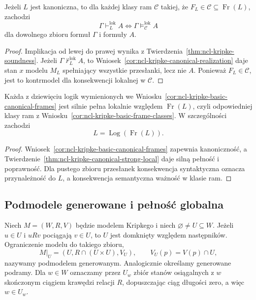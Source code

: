 \begin{twierdzenie}
\label{thm:ncl-kripke-canonical-strong-local}
Jeżeli $L$ jest kanoniczna, to dla każdej
klasy ram $\mathcal C$ takiej, że
$F_L\in\mathcal C\subseteq\operatorname{Fr}(L)$,
zachodzi
\[
 \Gamma\vdash_L^{\mathrm{lok}}A
 \iff\Gamma\models_{\mathcal C}^{\mathrm{lok}}A
\]
dla dowolnego zbioru formuł $\Gamma$ i formuły $A$.
\end{twierdzenie}
\begin{proof}
Implikacja od lewej do prawej wynika z
Twierdzenia~\ref{thm:ncl-kripke-soundness}.
Jeżeli $\Gamma\not\vdash_L^{\mathrm{lok}}A$,
to Wniosek~\ref{cor:ncl-kripke-canonical-realization}
daje stan $x$ modelu $M_L$ spełniający
wszystkie przesłanki, lecz nie $A$.
Ponieważ $F_L\in\mathcal C$, jest to
kontrmodel dla konsekwencji lokalnej w $\mathcal C$.
\end{proof}

\begin{wniosek}
\label{cor:ncl-kripke-basic-strong-local}
Każda z dziewięciu logik wymienionych we
Wniosku~\ref{cor:ncl-kripke-basic-canonical-frames}
jest silnie pełna lokalnie względem
$\operatorname{Fr}(L)$, czyli odpowiedniej klasy
ram z Wniosku~\ref{cor:ncl-kripke-basic-frame-classes}.
W szczególności zachodzi
\[
 L=\operatorname{Log}(\operatorname{Fr}(L)).
\]
\end{wniosek}
\begin{proof}
Wniosek~\ref{cor:ncl-kripke-basic-canonical-frames}
zapewnia kanoniczność, a
Twierdzenie~\ref{thm:ncl-kripke-canonical-strong-local}
daje silną pełność i poprawność.
Dla pustego zbioru przesłanek konsekwencja
syntaktyczna oznacza przynależność do $L$,
a konsekwencja semantyczna ważność w klasie ram.
\end{proof}

\subsection{Podmodele generowane i pełność globalna}

\begin{definicja}
\label{def:ncl-kripke-generated-submodel}
Niech $M=(W,R,V)$ będzie modelem Kripkego
i niech $\varnothing\ne U\subseteq W$.
Jeżeli $u\in U$ i $uRv$ pociągają $v\in U$,
to $U$ jest domknięty względem następników.
Ograniczenie modelu do takiego zbioru,
\[
 M|_U=(U,R\cap(U\times U),V_U),\qquad
 V_U(p)=V(p)\cap U,
\]
nazywamy podmodelem generowanym.
Analogicznie określamy generowane podramy.
Dla $w\in W$ oznaczamy przez $U_w$ zbiór
stanów osiągalnych z $w$ skończonym ciągiem
krawędzi relacji $R$, dopuszczając ciąg
długości zero, a więc $w\in U_w$.
\end{definicja}

